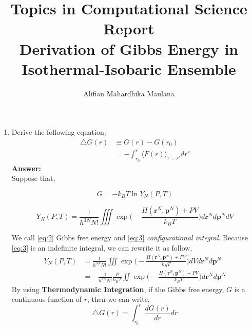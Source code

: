 \documentclass[a4paper,9pt]{article}
\title{Topics in Computational Science Report \\ Derivation of Gibbs Energy in Isothermal-Isobaric Ensemble}
\author{Alifian Mahardhika Maulana}
\begin{document}
\maketitle
\begin{enumerate}
	\item Derive the following equation,
		\begin{equation}\label{eq:1}
		\begin{aligned}
		\triangle G(r) &\equiv G(r) - G(r_0)\\
		& = -\int_{r_0}^{r} \langle F(r) \rangle_{r=r'} dr'
		\end{aligned}
		\end{equation}
		\textbf{Answer:}\\
		\newline
		Suppose that,
		\begin{center}
			\begin{minipage}{0.29\linewidth}
				\begin{equation}\label{eq:2}
				G = -k_B T \ln Y_N(P,T)
				\end{equation}
			\end{minipage}
		\quad
			\begin{minipage}{0.67\linewidth}
				\begin{equation}\label{eq:3}
				Y_N(P,T) = \frac{1}{h^{3N}N!} \iiint\exp\Bigg(-\frac{H(\textbf{r}^N,\textbf{p}^N) + PV}{k_B T}\Bigg) d\textbf{r}^N d\textbf{p}^N dV
				\end{equation}
			\end{minipage}
		\end{center}
	We call \eqref{eq:2} Gibbs free energy and \eqref{eq:3} \textit{configurational integral}.
		Because \eqref{eq:3} is an indefinite integral, we can rewrite it as follow,
		\begin{equation}\label{eq:4}
		\begin{aligned}
		Y_N(P,T) &= \frac{1}{h^{3N}N!} \iiint\exp\bigg(-\frac{H(\textbf{r}^N,\textbf{p}^N) + PV}{k_B T}\bigg) dV d\textbf{r}^N d\textbf{p}^N\\
		&= -\frac{1}{h^{3N}N!}\frac{P}{k_B T} \iint\exp\bigg(-\frac{H(\textbf{r}^N,\textbf{p}^N) + PV}{k_B T}\bigg)d\textbf{r}^N d\textbf{p}^N
		\end{aligned}
		\end{equation}
		By using \textbf{Thermodynamic Integration},
		if the Gibbs free energy, $G$ is a continuous function of $r$, then we can write,
		\begin{equation}\label{eq:5}
		\triangle G(r) = \int_{r_0}^{r} \frac{d G(r)}{dr} dr

\end{equation}
\end{enumerate}
\end{document}
